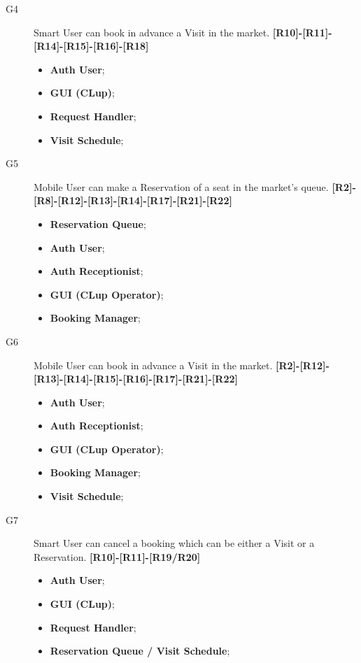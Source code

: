 \begin{description}
    
    \item[G4]Smart User can book in advance a Visit in the market. \textbf{[R10]-[R11]-[R14]-[R15]-[R16]-[R18]}
    \begin{itemize}
        \item \textbf{Auth User};  
        \item \textbf{GUI (CLup)};  
        \item \textbf{Request Handler}; 
        \item \textbf{Visit Schedule};  
     
    \end{itemize}
    
    \item[G5]Mobile User can make a Reservation of a seat in the market's queue. \textbf{[R2]-[R8]-[R12]-[R13]-[R14]-[R17]-[R21]-[R22]}
    \begin{itemize}
        \item \textbf{Reservation Queue};  
        \item \textbf{Auth User}; 
        \item \textbf{Auth Receptionist};  
        \item \textbf{GUI (CLup Operator)};  
        \item \textbf{Booking Manager};
    \end{itemize}
    
    \item[G6]Mobile User can book in advance a Visit in the market. \textbf{[R2]-[R12]-[R13]-[R14]-[R15]-[R16]-[R17]-[R21]-[R22]}
     \begin{itemize}
        \item \textbf{Auth User}; 
        \item \textbf{Auth Receptionist};  
        \item \textbf{GUI (CLup Operator)};  
        \item \textbf{Booking Manager};
        \item \textbf{Visit Schedule};  
    \end{itemize}
    
    \item[G7]Smart User can cancel a booking which can be either a Visit or a Reservation. \textbf{[R10]-[R11]-[R19/R20]}
    \begin{itemize}
        \item \textbf{Auth User}; 
        \item \textbf{GUI (CLup)};  
        \item \textbf{Request Handler};   
        \item \textbf{Reservation Queue / Visit Schedule};  
    \end{itemize}
    

\end{description}
